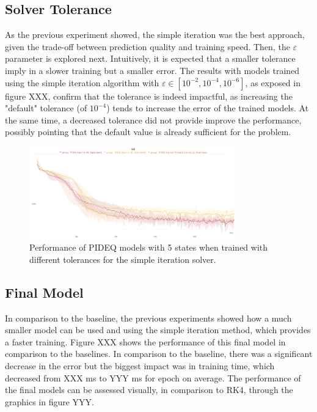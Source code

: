 \subsection{Solver Tolerance}

As the previous experiment showed, the simple iteration was the best approach, given the trade-off between prediction quality and training speed.
Then, the $\varepsilon$ parameter is explored next.
Intuitively, it is expected that a smaller tolerance imply in a slower training but a smaller error.
The results with models trained using the simple iteration algorithm with $\varepsilon \in \left[ 10^{-2}, 10^{-4},10^{-6} \right] $, as exposed in figure XXX, confirm that the tolerance is indeed impactful, as increasing the "default" tolerance (of $10^{-4}$) tends to increase the error of the trained models.
At the same time, a decreased tolerance did not provide improve the performance, possibly pointing that the default value is already sufficient for the problem.

\begin{figure}[h]
    \centering
    \includegraphics[width=0.8\textwidth]{images/exp_6_iae.png}
    \caption{Performance of \gls{PIDEQ} models with 5 states when trained with different tolerances for the simple iteration solver.}
    \label{fig:images-exp_6_iae-png}
\end{figure}

\subsection{Final Model}

In comparison to the baseline, the previous experiments showed how a much smaller model can be used and using the simple iteration method, which provides a faster training.
Figure XXX shows the performance of this final model in comparison to the baselines.
In comparison to the baseline, there was a significant decrease in the error but the biggest impact was in training time, which decreased from XXX ms to YYY ms for epoch on average. 
The performance of the final models can be assessed visually, in comparison to \gls{RK4}, through the graphics in figure YYY.

